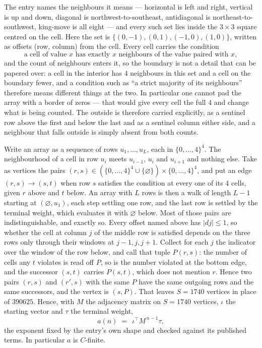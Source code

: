\documentclass[11pt,a4paper]{article}
\theoremstyle{plain}
\theoremstyle{definition}
\begin{document}
The entry names the neighbours it means --- horizontal is left and right, vertical is up and
down, diagonal is northwest-to-southeast, antidiagonal is northeast-to-southwest, king-move is
all eight --- and every such set lies inside the $3\times3$ square centred on the cell. Here
the set is $\{(0,-1), (0,1), (-1,0), (1,0)\}$, written as offsets (row, column) from the cell. Every cell carries
the condition
\[
\text{a cell of value }x\text{ has exactly }x\text{ neighbours of the value paired with }x,
\]
and the count of neighbours enters it, so the boundary is not a detail that can be papered
over: a cell in the interior has $4$ neighbours in this set and a cell on the boundary
fewer, and a condition such as ``a strict majority of its neighbours'' therefore means
different things at the two. In particular one cannot pad the array with a border of zeros ---
that would give every cell the full $4$ and change what is being counted. The outside is
therefore carried
explicitly, as a sentinel row above the first and below the last and as a sentinel column
either side, and a neighbour that falls outside is simply absent from both counts.

Write an array as a sequence of rows $u_1,\dots,u_L$, each in
$\{0,\dots,4\}^{4}$. The neighbourhood of a cell in row $u_i$ meets $u_{i-1}$,
$u_i$ and $u_{i+1}$ and nothing else. Take as vertices the pairs
$(r,s)\in(\{0,\dots,4\}^{4}\cup\{\varnothing\})\times\{0,\dots,4\}^{4}$,
and put an edge $(r,s)\to(s,t)$ when row $s$ satisfies the condition at every one of its
$4$ cells, given $r$ above and $t$ below. An array with $L$ rows is then a walk of length
$L-1$ starting at $(\varnothing,u_1)$, each step settling one row, and the last row is
settled by the terminal weight, which evaluates it with $\varnothing$ below. Most of those pairs are indistinguishable, and exactly so. Every offset named above has $|dj|\le 1$, so whether the cell at column $j$ of the middle row is satisfied depends on the three rows only through their windows at $j-1,j,j+1$. Collect for each $j$ the indicator over the window of the row below, and call that tuple $P(r,s)$: the number of cells any $t$ violates is read off $P$, so is the number violated at the bottom edge, and the successor $(s,t)$ carries $P(s,t)$, which does not mention $r$. Hence two pairs $(r,s)$ and $(r',s)$ with the same $P$ have the same outgoing rows and the same successors, and the vertex is $(s,P)$. That leaves $S=1740$ vertices in place of $390625$. Hence,
with $M$ the adjacency matrix on $S=1740$ vertices, $\iota$ the starting vector and $\tau$ the
terminal weight,
\[
a(n)\;=\;\,\iota^{\!\top}M^{\,n-1}\tau ,
\]
the exponent fixed by the entry's own shape and checked against its published terms. In
particular $a$ is $C$-finite.
\end{document}
